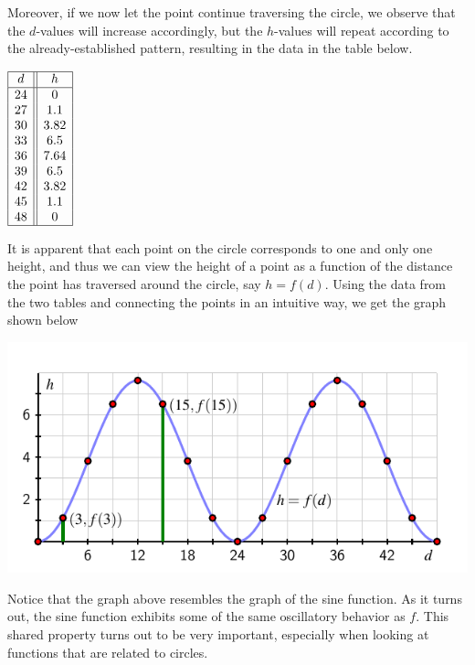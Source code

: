 \documentclass[nooutcomes]{ximera}
\begin{document}
Moreover, if we now let the point continue traversing the circle, we observe that the $d$-values will increase accordingly, but the $h$-values will repeat according to the already-established pattern, resulting in the data in the table below.

\begin{center}
$
\begin{array}{ |c || c|  }
 \hline
 d & h\\
 \hline
 24&0\\
 27&1.1\\
 30&3.82\\
 33&6.5\\
 36&7.64\\
 39&6.5\\
 42&3.82\\
 45&1.1\\
 48&0\\
 \hline
\end{array}
$
\end{center}

It is apparent that each point on the circle corresponds to one and only one height, and thus we can view the height of a point as a function of the distance the point has traversed around the circle, say $h = f(d)$.  Using the data from the two tables and connecting the points in an intuitive way, we get the graph shown below

\begin{image}
\includegraphics{traversing-first-example-graph.pdf}
\end{image}


Notice that the graph above resembles the graph of the sine function. As it turns out, the sine function exhibits some of the same oscillatory behavior as $f$. This shared property turns out to be very important, especially when looking at functions that are related to circles. 
\end{document}
